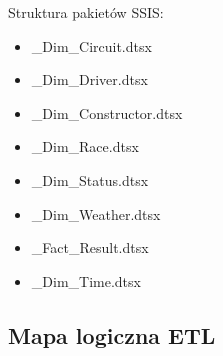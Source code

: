 \documentclass[a4paper,12pt]{article}
\begin{document}
Struktura pakietów SSIS:
\begin{itemize}
  \item \_Dim\_Circuit.dtsx
  \item \_Dim\_Driver.dtsx
  \item \_Dim\_Constructor.dtsx
  \item \_Dim\_Race.dtsx
  \item \_Dim\_Status.dtsx
  \item \_Dim\_Weather.dtsx
  \item \_Fact\_Result.dtsx
  \item \_Dim\_Time.dtsx
\end{itemize}

\subsection{Mapa logiczna ETL}

\end{document}
